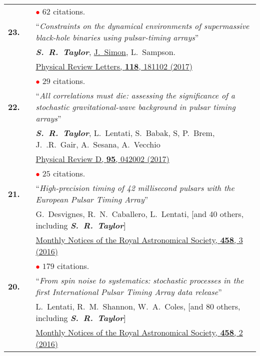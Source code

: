 \documentclass[11pt,letterpaper,sans]{moderncv}
\begin{document}
{\begin{longtable}{rp{0.3cm}p{15.8cm}}
&& \textcolor{red}{$\bullet$} $62$ citations. \vspace{0.09cm}\\
\textbf{23.} & & ``\textit{Constraints on the dynamical environments of supermassive black-hole binaries using pulsar-timing arrays}'' \\ 
&& \textit{\textbf{S.~R.~Taylor}}, \underline{J.~Simon}, L.~Sampson. \\
&& \href{https://journals.aps.org/prl/abstract/10.1103/PhysRevLett.118.181102}{{\color{color1} Physical Review Letters, \textbf{118}, 181102 (2017)}} \\
&& \textcolor{red}{$\bullet$} $29$ citations. \vspace{0.09cm}\\
\textbf{22.} & & ``\textit{All correlations must die: assessing the significance of a stochastic gravitational-wave background in pulsar timing arrays}'' \\ 
&& \textit{\textbf{S.~R.~Taylor}},  L.~Lentati, S.~Babak, S, P.~Brem, J.~.R.~Gair, A.~Sesana, A.~Vecchio \\ 
&&  \href{https://journals.aps.org/prd/abstract/10.1103/PhysRevD.95.042002}{{\color{color1} Physical Review D, \textbf{95}, 042002 (2017)}} \\
&& \textcolor{red}{$\bullet$} $25$ citations. \vspace{0.09cm}\\
\textbf{21.} & & ``\textit{High-precision timing of 42 millisecond pulsars with the European Pulsar Timing Array}'' \\ 
&& G.~Desvignes, R.~N.~Caballero, L.~Lentati, [and 40 others, including \textit{\textbf{S.~R.~Taylor}}] \\ 
&&  \href{http://mnras.oxfordjournals.org/content/458/3/3341}{{\color{color1} Monthly Notices of the Royal Astronomical Society, \textbf{458}, 3 (2016)}} \\
&& \textcolor{red}{$\bullet$} $179$ citations. \vspace{0.09cm}\\
\textbf{20.} & & ``\textit{From spin noise to systematics: stochastic processes in the first International Pulsar Timing Array data release}'' \\ 
&& L.~Lentati, R.~M.~Shannon, W.~A.~Coles, [and 80 others, including \textit{\textbf{S.~R.~Taylor}}] \\ 
&&  \href{http://mnras.oxfordjournals.org/content/458/2/2161}{{\color{color1} Monthly Notices of the Royal Astronomical Society, \textbf{458}, 2 (2016)}} \\

\end{longtable}}
\end{document}
